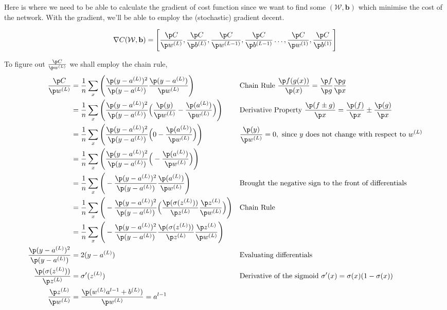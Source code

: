 \documentclass{homework}
\begin{document}
Here is where we need to be able to calculate the gradient of cost function since we want to find some $(\mathcal W, \mathbf b)$ which minimise the cost of the network. With the gradient, we'll be able to employ the (stochastic) gradient decent.

\[
  \nabla C(\mathcal W, \mathbf b)
  =
  \Bigg[\frac{\p C}{\p w^{(L)}}, \frac{\p C}{\p b^{(L)}}, \frac{\p C}{\p w^{(L-1)}}, \frac{\p C}{\p b^{(L-1)}} \hdots, \frac{\p C}{\p w^{(1)}}, \frac{\p C}{\p b^{(1)}}\Bigg]
\]

To figure out $\frac{\p C}{\p w^{(L)}}$ we shall employ the chain rule,
\begin{align*}
  \frac{\p C}{\p w^{(L)}}
  & = \frac{1}{n} \sum_x \Bigg( \frac{\p (y-a^{(L)})^2}{\p (y-a^{(L)})} \frac{\p (y-a^{(L)})}{\p w^{(L)}} \Bigg)
  && \text{Chain Rule } \frac{\p f(g(x))}{\p (x)} = \frac{\p f}{\p g}\frac{\p g}{\p x} \\ 
  & = \frac{1}{n} \sum_x \Bigg( \frac{\p (y-a^{(L)})^2}{\p (y-a^{(L)})} \Big(\frac{\p (y)}{\p w^{(L)}} - \frac{\p (a^{(L)})}{\p w^{(L)}} \Big)\Bigg)
  && \text{Derivative Property } \frac{\p (f \pm g)}{\p x} = \frac{\p (f)}{\p x} \pm \frac{\p (g)}{\p x} \\
  & = \frac{1}{n} \sum_x \Bigg( \frac{\p (y-a^{(L)})^2}{\p (y-a^{(L)})} \Big(0 - \frac{\p (a^{(L)})}{\p w^{(L)}} \Big)\Bigg)
  && \frac{\p (y)}{\p w^{(L)}} = 0, \text{ since } y \text{ does not change with respect to } w^{(L)} \\
  & = \frac{1}{n} \sum_x \Bigg( \frac{\p (y-a^{(L)})^2}{\p (y-a^{(L)})} \Big(- \frac{\p (a^{(L)})}{\p w^{(L)}} \Big)\Bigg) \\
  & = \frac{1}{n} \sum_x \Bigg( - \frac{\p (y-a^{(L)})^2}{\p (y-a^{(L)})} \frac{\p (a^{(L)})}{\p w^{(L)}} \Bigg)
  && \text{Brought the negative sign to the front of differentials} \\
  & = \frac{1}{n} \sum_x \Bigg( -\frac{\p (y-a^{(L)})^2}{\p (y-a^{(L)})} \Big(\frac{\p (\sigma(z^{(L)}))}{\p z^{(L)}} \frac{\p z^{(L)}}{\p w^{(L)}} \Big)\Bigg)
  && \text{Chain Rule} \\
  & = \frac{1}{n} \sum_x \Bigg( -\frac{\p (y-a^{(L)})^2}{\p (y-a^{(L)})} \frac{\p (\sigma(z^{(L)}))}{\p z^{(L)}} \frac{\p z^{(L)}}{\p w^{(L)}} \Bigg) \\
  \frac{\p (y-a^{(L)})^2}{\p (y-a^{(L)})}
  & = 2(y-a^{(L)})
  && \text{Evaluating differentials} \\
  \frac{\p (\sigma(z^{(L)}))}{\p z^{(L)}}
  & = \sigma'(z^{(L)})
  && \text{Derivative of the sigmoid } \sigma'(x) = \sigma(x)(1-\sigma(x)) \\
  \frac{\p z^{(L)}}{\p w^{(L)}}
  & = \frac{\p (w^{(L)} a^{l-1} + b^{(L)})}{\p w^{(L)}} = a^{l-1}
\end{align*}
\end{document}

